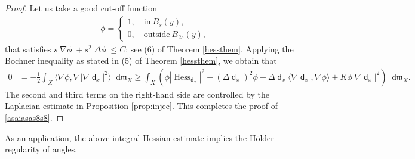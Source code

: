 \documentclass[11pt,reqno]{amsart}
\theoremstyle{definition}
\numberwithin{equation}{section}
\newcommand{\di}{\mathop{}\!\mathrm{d}}
\newcommand{\meas}{\mathfrak{m}}
\DeclareMathOperator{\dist}{\mathsf{d}}
\DeclareMathOperator{\Hess}{Hess}
\begin{document}
\begin{proof}
Let us take a good cut-off function
\begin{align}
\phi 
= 
\begin{cases}
1, \quad \text{in}\ B_s(y),
\\
0, \quad \text{outside} \ B_{2s}(y),
\end{cases}
\end{align}
that satisfies $s|\nabla \phi| + s^2 |\Delta \phi| \leq C$; see (6) of Theorem \ref{hessthem}.
 Applying the Bochner inequality as stated in (5) of Theorem \ref{hessthem}, we obtain that
\begin{align*}
0&=-\frac{1}{2}\int_X\langle \nabla \phi, \nabla |\nabla \dist_x|^2\rangle \di \meas_X \ge \int_X\left(\phi |\Hess_{\dist_x}|^2-(\Delta \dist_x)^2\phi-\Delta \dist_x\langle \nabla \dist_x, \nabla \phi \rangle +K\phi|\nabla \dist_x|^2\right) \di \meas_X.
\end{align*}
The second and third terms on the right-hand side are controlled by the Laplacian estimate in  Proposition \ref{prop:injec}. This completes the proof of   \eqref{asaiasas8s8}.
\end{proof}

As an application, the above integral Hessian estimate implies the H\"older regularity of angles.
\end{document}
